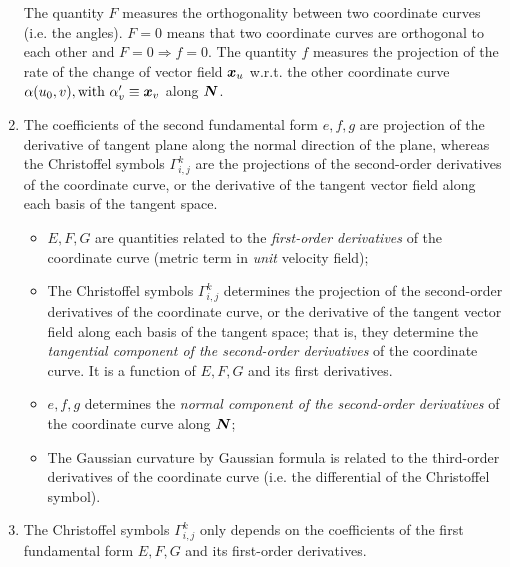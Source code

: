 \documentclass[11pt]{article}
\begin{document}
\begin{enumerate}
 The quantity $F$ measures the orthogonality between two coordinate curves (i.e. the angles). $F=0$ means that two coordinate curves are orthogonal to each other and $F=0 \Rightarrow f=0$. The quantity $f$ measures the projection of the rate of the change of vector field $\boldsymbol{x}_{u}$ w.r.t. the other coordinate curve $\alpha(u_{0}, v), \text{with }\alpha_{v}' \equiv \boldsymbol{x}_{v}$ along $\boldsymbol{N}$.


\item The coefficients of the second fundamental form $e,f,g$ are projection of the derivative of tangent plane along the normal direction of the plane, whereas the Christoffel symbols $\Gamma_{i,j}^{k}$ are the projections of the second-order derivatives of the coordinate curve, or the derivative of the tangent vector field along each basis of the tangent space. 

\begin{itemize}
\item $E,F,G$ are quantities related to the \emph{first-order derivatives} of the coordinate curve (metric term in \emph{unit} velocity field);

\item The Christoffel symbols  $\Gamma_{i,j}^{k}$ determines  the projection of the second-order derivatives of the coordinate curve, or the derivative of the tangent vector field along each basis of the tangent space; that is, they determine the \emph{tangential component of the second-order derivatives} of the coordinate curve. It is a function of $E,F,G$ and its first derivatives. 

\item $e,f,g$ determines the \emph{normal component of the second-order derivatives} of the coordinate curve along $\boldsymbol{N}$;

\item The Gaussian curvature by Gaussian formula is related to the third-order derivatives of the coordinate curve (i.e. the differential of the Christoffel symbol). 
\end{itemize}

\item The Christoffel symbols $\Gamma_{i,j}^{k}$ only depends on the coefficients of the first fundamental form $E,F,G$ and its first-order derivatives. 


\end{enumerate}
\end{document}
